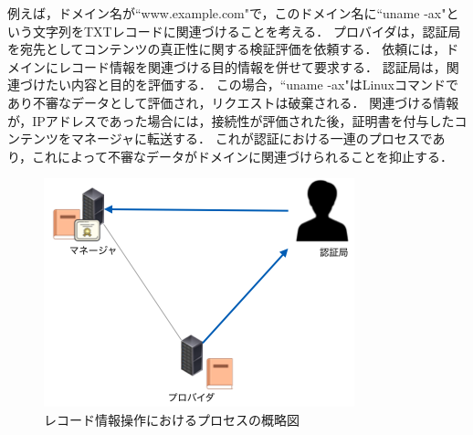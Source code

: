 例えば，ドメイン名が``www.example.com"で，このドメイン名に``uname -ax"という文字列をTXTレコードに関連づけることを考える．
プロバイダは，認証局を宛先としてコンテンツの真正性に関する検証評価を依頼する．
依頼には，ドメインにレコード情報を関連づける目的情報を併せて要求する．
認証局は，関連づけたい内容と目的を評価する．
この場合，``uname -ax"はLinuxコマンドであり不審なデータとして評価され，リクエストは破棄される．
関連づける情報が，IPアドレスであった場合には，接続性が評価された後，証明書を付与したコンテンツをマネージャに転送する．
これが認証における一連のプロセスであり，これによって不審なデータがドメインに関連づけられることを抑止する．
\begin{figure}[h]
 \centering
 \includegraphics[scale=0.7]{figure/certificate-procedure.png}
 \caption{レコード情報操作におけるプロセスの概略図}
 \label{fig:manager-provider}
\end{figure}


\newpage
